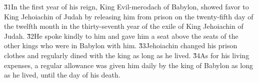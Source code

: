 \v{31}In the first year of his reign, King Evil-merodach of Babylon, showed favor to King Jehoiachin of Judah by releasing him from prison on the twenty-fifth day of the twelfth month in the thirty-seventh year of the exile of King Jehoiachin of Judah. \v{32}He spoke kindly to him and gave him a seat above the seats of the other kings who were in Babylon with him. \v{33}Jehoiachin changed his prison clothes and regularly dined with the king as long as he lived. \v{34}As for his living expenses, a regular allowance was given him daily by the king of Babylon as long as he lived, until the day of his death.
